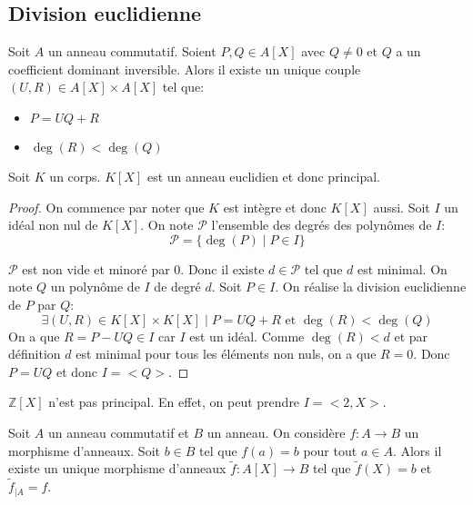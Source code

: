 \subsection{Division euclidienne}

\begin{prop}
	Soit $A$ un anneau commutatif. Soient $P, Q \in A[X]$ avec $Q \neq 0$ et
	$Q$ a un coefficient dominant inversible. Alors il existe un unique couple
	$(U, R) \in A[X] \times A[X]$ tel que:
	\begin{itemize}
		\item $P = UQ + R$
		\item $\deg(R) < \deg(Q)$
	\end{itemize}
\end{prop}

\begin{prop}
	Soit $K$ un corps. $K[X]$ est un anneau euclidien et donc principal.
\end{prop}

\begin{proof}
	On commence par noter que $K$ est intègre et donc $K[X]$ aussi.
	Soit $I$ un idéal non nul de $K[X]$. On note $\mathcal{P}$ l'ensemble des degrés des polynômes de $I$:
	\[\mathcal{P} = \{ \deg(P) \mid P \in I \}\]

	$\mathcal{P}$ est non vide et minoré par $0$. Donc il existe $d \in \mathcal{P}$ tel que $d$ est minimal.
	On note $Q$ un polynôme de $I$ de degré $d$. Soit $P \in I$. On réalise la division euclidienne de $P$ par $Q$:
	\[ \exists (U, R) \in K[X] \times K[X] \mid P = UQ + R \text{ et } \deg(R) < \deg(Q) \]
	On a que $R = P - UQ \in I$  car $I$ est un idéal. Comme $\deg(R) < d$ et par définition $d$ est minimal pour
	tous les éléments non nuls, on a que $R = 0$. Donc $P = UQ$ et donc $I = <Q>$.
\end{proof}


\begin{example}
	$\mathbb{Z}[X]$ n'est pas principal. En effet, on peut prendre $I = <2, X>$.
\end{example}

\begin{theorem}\label{thm:prop_univ_anneau_poly}
	Soit $A$ un anneau commutatif et $B$ un anneau. On considère $f: A \to B$ un morphisme d'anneaux.
	Soit $b \in B$ tel que $f(a) = b$ pour tout $a \in A$. Alors il existe un unique morphisme d'anneaux
	$\tilde{f}: A[X] \to B$ tel que $\tilde{f}(X) = b$ et $\tilde{f}_{|A} = f$.
\end{theorem}

